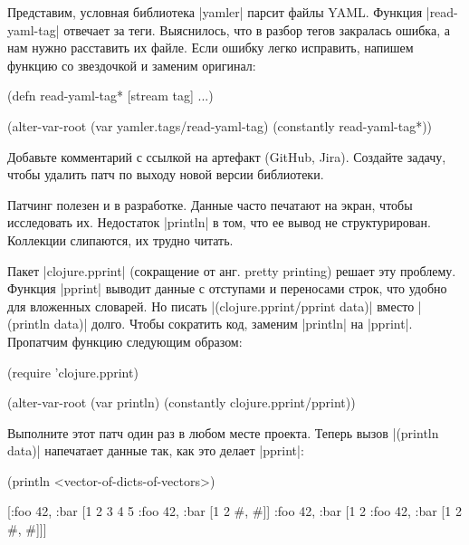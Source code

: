 Представим, условная библиотека \spverb|yamler| парсит файлы YAML. Функция
\spverb|read-yaml-tag| отвечает за теги. Выяснилось, что в разбор тегов
закралась ошибка, а нам нужно расставить их файле. Если ошибку легко исправить,
напишем функцию со звездочкой и заменим оригинал:

\begin{english}
  \begin{clojure}
(defn read-yaml-tag* [stream tag]
  ...)

(alter-var-root
 (var yamler.tags/read-yaml-tag)
 (constantly read-yaml-tag*))
  \end{clojure}
\end{english}

Добавьте комментарий с ссылкой на артефакт (GitHub, Jira). Создайте задачу,
чтобы удалить патч по выходу новой версии библиотеки.

Патчинг полезен и в разработке. Данные часто печатают на экран, чтобы
исследовать их. Недостаток \spverb|println| в том, что ее вывод не
структурирован. Коллекции слипаются, их трудно читать.

Пакет \spverb|clojure.pprint| (сокращение от анг. pretty printing) решает эту
проблему. Функция \spverb|pprint| выводит данные с отступами и переносами строк,
что удобно для вложенных словарей. Но писать \spverb|(clojure.pprint/pprint data)|
вместо \spverb|(println data)| долго. Чтобы сократить код, заменим \spverb|println|
на \spverb|pprint|. Пропатчим функцию следующим образом:

\begin{english}
  \begin{clojure}
(require 'clojure.pprint)

(alter-var-root
 (var println)
 (constantly clojure.pprint/pprint))
  \end{clojure}
\end{english}

Выполните этот патч один раз в любом месте проекта. Теперь вызов
\spverb|(println data)| напечатает данные так, как это делает \spverb|pprint|:

\begin{english}
  \begin{clojure}
(println <vector-of-dicts-of-vectors>)

[{:foo 42, :bar [1 2 3 4 5 {:foo 42, :bar [1 2 {#, #}]}]}
 {:foo 42, :bar [1 2 {:foo 42, :bar [1 2 {#, #}]}]}]
  \end{clojure}
\end{english}

